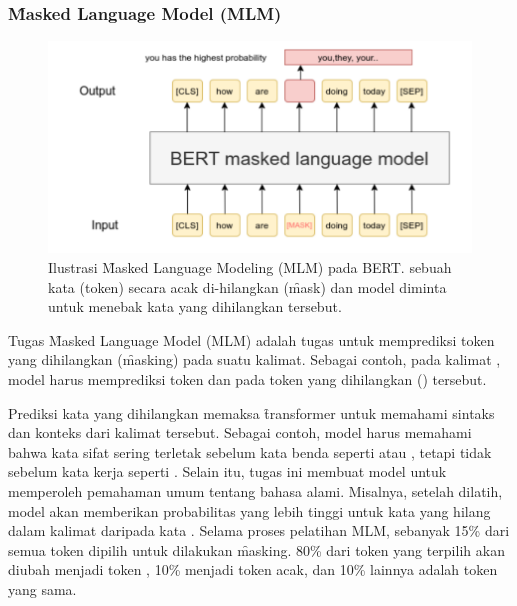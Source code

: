 	\subsubsection{\f{Masked Language Model} (MLM)}
	\label{sec:masked-language-model}

	\begin{figure}[!ht]
		\centering
		\includegraphics[width=1\textwidth]{assets/pics/MLM.png}
		\caption{Ilustrasi \f{Masked Language Modeling} (MLM) pada BERT. sebuah kata (token) secara acak di-hilangkan (\f{mask}) dan model diminta untuk menebak kata yang dihilangkan tersebut.}
		\label{fig:masked-language-model}
	\end{figure}

	Tugas \f{Masked Language Model} (MLM) adalah tugas untuk memprediksi token yang dihilangkan (\f{masking}) pada suatu kalimat. Sebagai contoh, pada kalimat , model harus memprediksi token  dan  pada token yang dihilangkan (\code{[MASK]}) tersebut.


	Prediksi kata yang dihilangkan memaksa \f{transformer} untuk memahami sintaks dan konteks dari kalimat tersebut. Sebagai contoh, model harus memahami bahwa kata sifat  sering terletak sebelum kata benda seperti  atau , tetapi tidak sebelum kata kerja seperti . Selain itu, tugas ini membuat model untuk memperoleh pemahaman umum tentang bahasa alami. Misalnya, setelah dilatih, model akan memberikan probabilitas yang lebih tinggi untuk kata  yang hilang dalam kalimat  daripada kata . Selama proses pelatihan MLM, sebanyak 15\% dari semua token dipilih untuk dilakukan \f{masking}. 80\% dari token yang terpilih akan diubah menjadi token \code{[MASK]}, 10\% menjadi token acak, dan 10\% lainnya adalah token yang sama.

